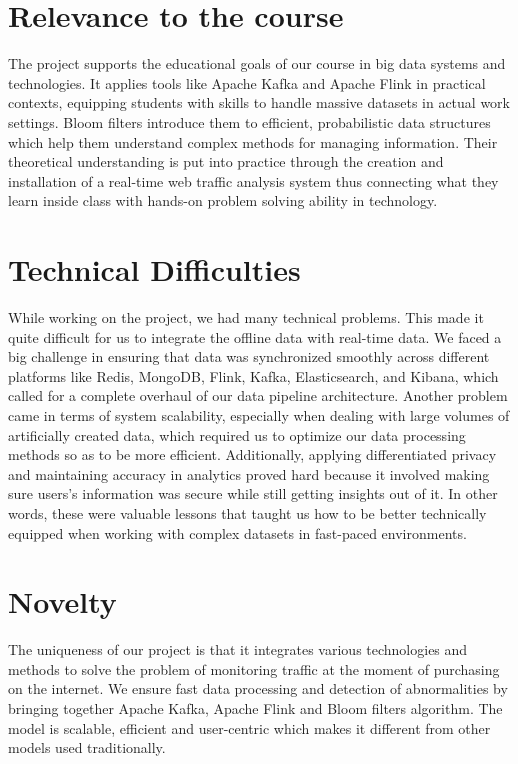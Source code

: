 \documentclass[conference]{IEEEtran}
\begin{document}
\section{Relevance to the course}

The project supports the educational goals of our course in big data systems and technologies. It applies tools like Apache Kafka and Apache Flink in practical contexts, equipping students with skills to handle massive datasets in actual work settings. Bloom filters introduce them to efficient, probabilistic data structures which help them understand complex methods for managing information. Their theoretical understanding is put into practice through the creation and installation of a real-time web traffic analysis system thus connecting what they learn inside class with hands-on problem solving ability in technology.

\section{Technical Difficulties}
While working on the project, we had many technical problems. This made it quite difficult for us to integrate the offline data with real-time data. We faced a big challenge in ensuring that data was synchronized smoothly across different platforms like Redis, MongoDB, Flink, Kafka, Elasticsearch, and Kibana, which called for a complete overhaul of our data pipeline architecture. Another problem came in terms of system scalability, especially when dealing with large volumes of artificially created data, which required us to optimize our data processing methods so as to be more efficient. Additionally, applying differentiated privacy and maintaining accuracy in analytics proved hard because it involved making sure users’s information was secure while still getting insights out of it. In other words, these were valuable lessons that taught us how to be better technically equipped when working with complex datasets in fast-paced environments.

\section{Novelty}
The uniqueness of our project is that it integrates various technologies and methods to solve the problem of monitoring traffic at the moment of purchasing on the internet. We ensure fast data processing and detection of abnormalities by bringing together Apache Kafka, Apache Flink and Bloom filters algorithm. The model is scalable, efficient and user-centric which makes it different from other models used traditionally.
\end{document}
